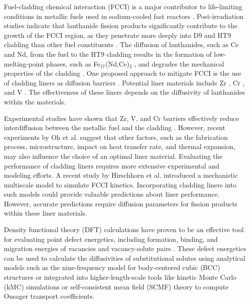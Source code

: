 \documentclass[preprint,12pt]{elsarticle}
\begin{document}
Fuel-cladding chemical interaction (FCCI) is a major contributor to life-limiting conditions in metallic fuels used in sodium-cooled fast reactors \cite{hofman_metallic_1997, pahl_experimental_1990, matthews_fuel-cladding_2017}. Post-irradiation studies indicate that lanthanide fission products significantly contribute to the growth of the FCCI region, as they penetrate more deeply into D9 and HT9 cladding than other fuel constituents \cite{matthews_fuel-cladding_2017,keiser_fuel_2019}. The diffusion of lanthanides, such as Ce and Nd, from the fuel to the HT9 cladding results in the formation of low-melting-point phases, such as Fe$_{17}$(Nd,Ce)$_2$ \cite{harp_scanning_2017}, and degrades the mechanical properties of the cladding \cite{thomas2021nano}. One proposed approach to mitigate FCCI is the use of cladding liners as diffusion barriers \cite{crawford_performance_1993, ryu_performance_2009, beausoleil_fast_2022}. Potential liner materials include Zr \cite{kim_performance_2009, jee_improvement_2013, lee_effect_2015}, Cr \cite{yang_fcci_2010, oh_comparative_2024}, and V \cite{lo_vanadium_2014, lee_vanadium_2012}. The effectiveness of these liners depends on the diffusivity of lanthanides within the materials. 

Experimental studies have shown that Zr, V, and Cr barriers effectively reduce interdiffusion between the metallic fuel and the cladding \cite{kim_performance_2009,yang_fcci_2010, lee_vanadium_2012}. However, recent experiments by Oh et al. \cite{OH2024113102} suggest that other factors, such as the fabrication process, microstructure, impact on heat transfer rate, and thermal expansion, may also influence the choice of an optimal liner material. Evaluating the performance of cladding liners requires more extensive experimental and modeling efforts. A recent study by Hirschhorn et al. \cite{HIRSCHHORN2025113811} introduced a mechanistic multiscale model to simulate FCCI kinetics. Incorporating cladding liners into such models could provide valuable predictions about liner performance. However, accurate predictions require diffusion parameters for fission products within these liner materials.

Density functional theory (DFT) calculations have proven to be an effective tool for evaluating point defect energetics, including formation, binding, and migration energies of vacancies and vacancy-solute pairs \cite{mantina2009first, huang2010calculation,becquart2012solute,messina_exact_2014}. These defect energetics can be used to calculate the diffusivities of substitutional solutes using analytical models such as the nine-frequency model \cite{leclaire1970solvent} for body-centered cubic (BCC) structures or integrated into higher-length-scale tools like kinetic Monte Carlo (kMC) simulations \cite{van_der_ven_first_2005} or self-consistent mean field (SCMF) theory \cite{nastar_self-consistent_2000, nastar_mean_2005} to compute Onsager transport coefficients.
\end{document}
